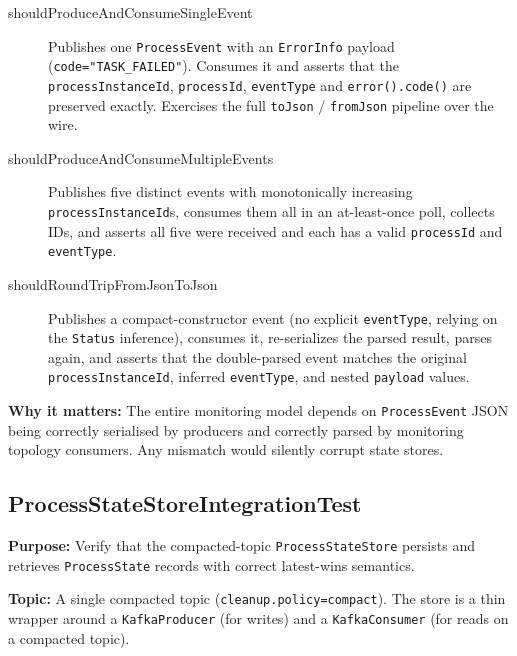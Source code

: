 \begin{description}

\item[shouldProduceAndConsumeSingleEvent] Publishes one \texttt{ProcessEvent}
with an \texttt{ErrorInfo} payload (\texttt{code="TASK\_FAILED"}). Consumes it
and asserts that the \texttt{processInstanceId}, \texttt{processId},
\texttt{eventType} and \texttt{error().code()} are preserved exactly.
Exercises the full \texttt{toJson} / \texttt{fromJson} pipeline over the wire.

\item[shouldProduceAndConsumeMultipleEvents] Publishes five distinct events
with monotonically increasing \texttt{processInstanceId}s, consumes them all
in an at-least-once poll, collects IDs, and asserts all five were received
and each has a valid \texttt{processId} and \texttt{eventType}.

\item[shouldRoundTripFromJsonToJson] Publishes a compact-constructor event
(no explicit \texttt{eventType}, relying on the \texttt{Status} inference),
consumes it, re-serializes the parsed result, parses again, and asserts that
the double-parsed event matches the original \texttt{processInstanceId},
inferred \texttt{eventType}, and nested \texttt{payload} values.

\end{description}

\textbf{Why it matters:} The entire monitoring model depends on
\texttt{ProcessEvent} JSON being correctly serialised by producers and
correctly parsed by monitoring topology consumers. Any mismatch would
silently corrupt state stores.


\subsection{ProcessStateStoreIntegrationTest}
\label{it:processStateStore}

\textbf{Purpose:} Verify that the compacted-topic \texttt{ProcessStateStore}
persists and retrieves \texttt{ProcessState} records with correct
latest-wins semantics.

\textbf{Topic:} A single compacted topic (\texttt{cleanup.policy=compact}).
The store is a thin wrapper around a \texttt{KafkaProducer} (for writes) and
a \texttt{KafkaConsumer} (for reads on a compacted topic).

